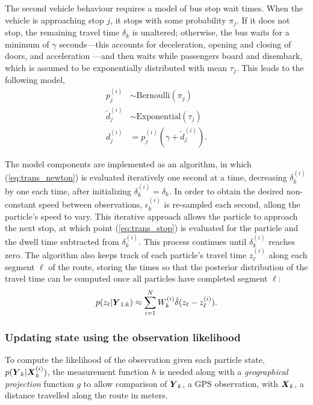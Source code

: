 The second vehicle behaviour requires a model of bus stop wait times.
When the vehicle is approaching stop $j$,
it stops with some probability $\pi_j$.
If it does not stop, the remaining travel time $\delta_k$ is unaltered;
otherwise, the bus waits for a minimum of $\gamma$ seconds---this 
accounts for deceleration, opening and closing of doors, and acceleration
\citep{Hans_2015}---and then waits while passengers board and disembark,
which is assumed to be exponentially distributed with mean $\tau_j$.
This leads to the following model,
\begin{equation}
\label{eq:trans_stop}
\begin{split}
p_j^{(i)} &\sim \mathrm{Bernoulli}(\pi_j) \\
\tilde d_j^{(i)} &\sim \mathrm{Exponential}(\tau_j) \\
d_j^{(i)} &= p_j^{(i)}(\gamma + \tilde d_j^{(i)}).
\end{split}
\end{equation}


The model components are implemented as an algorithm,
in which (\ref{eq:trans_newton}) is evaluated iteratively one second at a time,
decreasing $\delta_k^{(i)}$ by one each time,
after initializing $\delta_k^{(i)} = \delta_k$.
In order to obtain the desired non-constant speed between observations,
$\epsilon_k^{(i)}$ is re-sampled each second,
allong the particle's speed to vary.
This iterative approach allows the particle to approach the next stop,
at which point (\ref{eq:trans_stop}) is evaluated for the particle
and the dwell time subtracted from $\delta_k^{(i)}$.
This process continues until $\delta_k^{(i)}$ reaches zero.
The algorithm also keeps track of each particle's travel time $z_\ell^{(i)}$
along each segment $\ell$ of the route,
storing the times so that the posterior distribution of the travel time
can be computed once all particles have completed segment $\ell$:
\begin{equation}
\label{eq:post_tt}
p(z_\ell | \mbox{$\boldsymbol{Y}$}_{1:k}) \approx
    \sum_{i=1}^N W_k^{(i)} \dot\delta(z_\ell - z_\ell^{(i)}).
\end{equation}



\subsubsection{Updating state using the observation likelihood}
\label{sec:pf_update}

To compute the likelihood of the observation given each particle state,
$p(\mbox{$\boldsymbol{Y}$}_k|\mbox{$\boldsymbol{X}$}_k^{(i)})$,
the measurement function $h$ is needed along with 
a \emph{geographical projection} function $g$ to allow comparison of $\mbox{$\boldsymbol{Y}$}_k$,
a GPS observation, with $\mbox{$\boldsymbol{X}$}_k$, a distance travelled along the route in meters.

